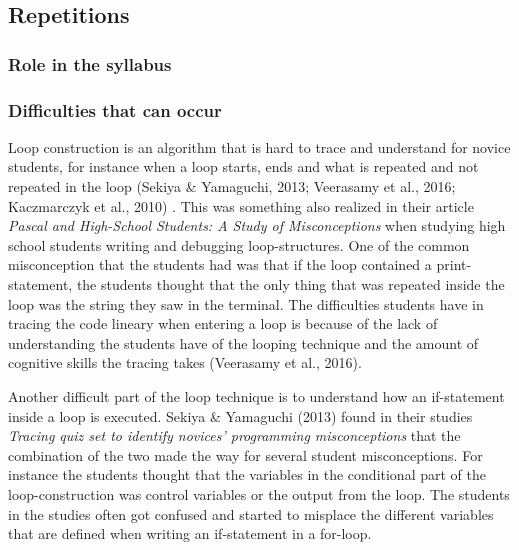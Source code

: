 \subsection{Repetitions}

\subsubsection{Role in the syllabus}

\subsubsection{Difficulties that can occur}

Loop construction is an algorithm that is hard to trace and understand for 
novice students, for instance when a loop starts, ends and what is repeated and 
not repeated in the loop (Sekiya \& Yamaguchi, 2013; Veerasamy et al., 2016; 
Kaczmarczyk et al., 2010) . This was something \textcite{Sleeman1984} also 
realized in their article \emph{Pascal and High-School Students: A Study of 
Misconceptions} when studying high school students writing and debugging 
loop-structures. One of the common misconception that the students had was that 
if the loop contained a print-statement, the students thought that the only 
thing that was repeated inside the loop was the string they saw in the 
terminal. The difficulties students have in tracing the code lineary when 
entering a loop is because of the lack of understanding the students have of 
the looping technique and the amount of cognitive skills the tracing takes 
(Veerasamy et al., 2016). 

Another difficult part of the loop technique is to understand how an if-statement inside a loop is executed. Sekiya \& Yamaguchi (2013) found in their studies \emph{Tracing quiz set to identify novices' programming misconceptions} that the combination of the two made the way for several student misconceptions. For instance the students thought that the variables in the conditional part of the loop-construction was control variables or the output from the loop. The students in the studies often got confused and started to misplace the different variables that are defined when writing an if-statement in a for-loop.

